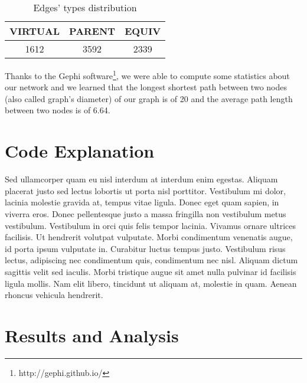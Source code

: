 \begin{table}[!h]
\centering
\begin{tabular}{|c|c|c|}
\hline
{\bf VIRTUAL} & {\bf PARENT} & {\bf EQUIV} \\ \hline
1612          & 3592         & 2339      \\ \hline
\end{tabular}
\caption{Edges' types distribution}
\label{table:edges}
\end{table}



Thanks to the Gephi software\footnote{http://gephi.github.io/}, we were able to compute some statistics about our network and we learned that the longest shortest path between two nodes (also called graph's diameter) of our graph is of 20 and the average path length between two nodes is of 6.64.




\section{Code Explanation}

Sed ullamcorper quam eu nisl interdum at interdum enim egestas. Aliquam placerat justo sed lectus lobortis ut porta nisl porttitor. Vestibulum mi dolor, lacinia molestie gravida at, tempus vitae ligula. Donec eget quam sapien, in viverra eros. Donec pellentesque justo a massa fringilla non vestibulum metus vestibulum. Vestibulum in orci quis felis tempor lacinia. Vivamus ornare ultrices facilisis. Ut hendrerit volutpat vulputate. Morbi condimentum venenatis augue, id porta ipsum vulputate in. Curabitur luctus tempus justo. Vestibulum risus lectus, adipiscing nec condimentum quis, condimentum nec nisl. Aliquam dictum sagittis velit sed iaculis. Morbi tristique augue sit amet nulla pulvinar id facilisis ligula mollis. Nam elit libero, tincidunt ut aliquam at, molestie in quam. Aenean rhoncus vehicula hendrerit.

\section{Results and Analysis}

